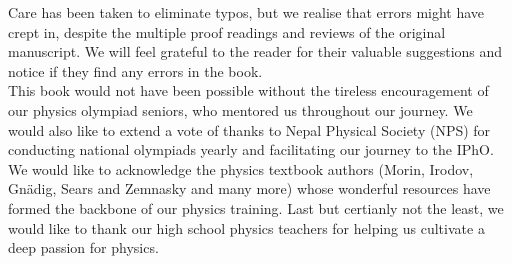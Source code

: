 \hspace{1 cm} Care has been taken to eliminate typos, but we realise that errors might have crept in, despite the multiple proof readings and reviews of the original manuscript. We will feel grateful to the reader for their valuable suggestions and notice if they find any errors in the book.\\

\hspace{1cm} This book would not have been possible without the tireless encouragement of our physics olympiad seniors, who mentored us throughout our journey. We would also like to extend a vote of thanks to Nepal Physical Society (NPS) for conducting national olympiads yearly and facilitating our journey to the IPhO. We would like to acknowledge the physics textbook authors (Morin, Irodov, Gn\"adig, Sears and Zemnasky and many more) whose wonderful resources have formed the backbone of our physics training. Last but certianly not the least, we would like to thank our high school physics teachers for helping us cultivate a deep passion for physics.
